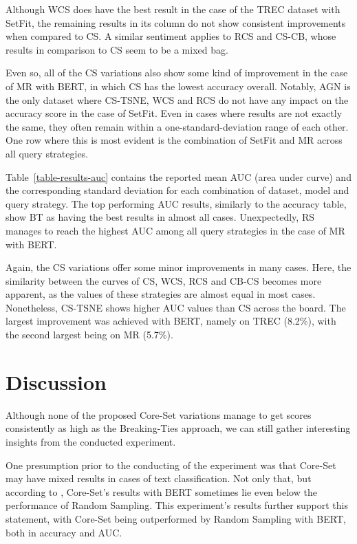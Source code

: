 \documentclass[english,bachelor,ul]{webisthesis} %
\begin{document}
Although WCS does have the best result in the case of the TREC dataset with SetFit, the remaining results in its column do not show consistent improvements when compared to CS. A similar sentiment applies to RCS and CS-CB, whose results in comparison to CS seem to be a mixed bag. 

Even so, all of the CS variations also show some kind of improvement in the case of MR with BERT, in which CS has the lowest accuracy overall. Notably, AGN is the only dataset where CS-TSNE, WCS and RCS do not have any impact on the accuracy score in the case of SetFit. Even in cases where results are not exactly the same, they often remain within a one-standard-deviation range of each other. One row where this is most evident is the combination of SetFit and MR across all query strategies.

Table~\ref{table-results-auc} contains the reported mean AUC (area under curve) and the corresponding standard deviation for each combination of dataset, model and query strategy. The top performing AUC results, similarly to the accuracy table, show BT as having the best results in almost all cases. Unexpectedly, RS manages to reach the highest AUC among all query strategies in the case of MR with BERT.

Again, the CS variations offer some minor improvements in many cases. Here, the similarity between the curves of CS, WCS, RCS and CB-CS becomes more apparent, as the values of these strategies are almost equal in most cases. Nonetheless, CS-TSNE shows higher AUC values than CS across the board. The largest improvement was achieved with BERT, namely on TREC (8.2\%), with the second largest being on MR (5.7\%).

\chapter{Discussion}

Although none of the proposed Core-Set variations manage to get scores consistently as high as the Breaking-Ties approach, we can still gather interesting insights from the conducted experiment. 

One presumption prior to the conducting of the experiment was that Core-Set may have mixed results in cases of text classification. Not only that, but according to \cite{DBLP:conf/kdd/0002MM21}, Core-Set's results with BERT sometimes lie even below the performance of Random Sampling. This experiment's results further support this statement, with Core-Set being outperformed by Random Sampling with BERT, both in accuracy and AUC.
\end{document}
